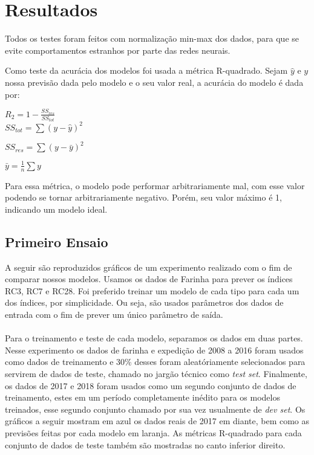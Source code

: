 \documentclass[a4paper]{article}
\begin{document}
\section{Resultados}


Todos os testes foram feitos com normalização min-max dos dados, para que se evite comportamentos estranhos por parte das redes neurais. \\

\bigskip

Como teste da acurácia dos modelos foi usada a métrica R-quadrado. Sejam $\hat{y}$ e $y$ nossa previsão dada pelo modelo e o seu valor real, a acurácia do modelo é dada por:\\

\bigskip

\centering
$R_2 = 1 - \frac{SS_{res}}{SS_{tot}}$\\

$SS_{tot} = \sum (y - \hat{y})^2$

$SS_{res} = \sum (y - \bar{y})^2$

$  \bar{y} = \frac{1}{n} \sum y$
\bigskip

\justify
Para essa métrica, o modelo pode performar arbitrariamente mal, com esse valor podendo se tornar arbitrariamente negativo. Porém, seu valor máximo é 1, indicando um modelo ideal.\\

\bigskip
\subsection{Primeiro Ensaio}
A seguir são reproduzidos gráficos de um experimento realizado com o fim de comparar nossos modelos. Usamos os dados de Farinha para prever os índices RC3, RC7 e RC28. Foi preferido treinar um modelo de cada tipo para cada um dos índices, por simplicidade. Ou seja, são usados parâmetros dos dados de entrada com o fim de prever um único parâmetro de saída. 
\\
\\
Para o treinamento e teste de cada modelo, separamos os dados em duas partes. Nesse experimento os dados de farinha e expedição de 2008 a 2016 foram usados como dados de treinamento e 30\% desses foram aleatóriamente selecionados para servirem de dados de teste, chamado no jargão técnico como \textit{test set}. Finalmente, os dados de 2017 e 2018 foram usados como um segundo conjunto de dados de treinamento, estes em um período completamente inédito para os modelos treinados, esse segundo conjunto chamado por sua vez usualmente de \textit{dev set}. Os gráficos a seguir mostram em azul os dados reais de 2017 em diante, bem como as previsões feitas por cada modelo em laranja. As métricas R-quadrado para cada conjunto de dados de teste também são mostradas no canto inferior direito.
\end{document}

